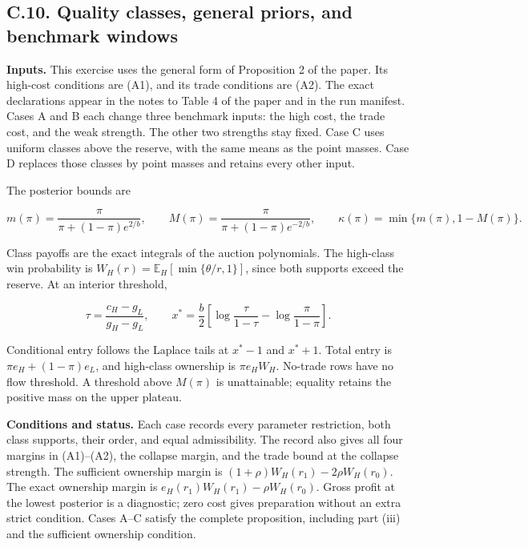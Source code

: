 \subsection{C.10. Quality classes, general priors, and benchmark
windows}\label{oa-c-classes}

\textbf{Inputs.} This exercise uses the general form of Proposition 2
of the paper. Its high-cost conditions are (A1), and its trade
conditions are (A2). The exact declarations appear in the notes to
Table 4 of the paper and in the run manifest. Cases A and B each change
three benchmark inputs: the high cost, the trade cost, and the weak
strength. The other two strengths stay fixed. Case C uses uniform
classes above the reserve, with the same means as the point masses.
Case D replaces those classes by point masses and retains every other
input.

The posterior bounds are

\[
m(\pi)=\frac{\pi}{\pi+(1-\pi)e^{2/b}},\qquad
M(\pi)=\frac{\pi}{\pi+(1-\pi)e^{-2/b}},\qquad
\kappa(\pi)=\min\{m(\pi),1-M(\pi)\}.
\]

Class payoffs are the exact integrals of the auction polynomials. The
high-class win probability is
\(W_H(r)=\mathbb E_H[\min\{\theta/r,1\}]\), since both supports exceed
the reserve. At an interior threshold,

\[
\tau=\frac{c_H-g_L}{g_H-g_L},\qquad
x^*=\frac b2\left[\log\frac{\tau}{1-\tau}-\log\frac{\pi}{1-\pi}\right].
\]

Conditional entry follows the Laplace tails at \(x^*-1\) and
\(x^*+1\). Total entry is \(\pi e_H+(1-\pi)e_L\), and high-class
ownership is \(\pi e_HW_H\). No-trade rows have no flow threshold. A
threshold above \(M(\pi)\) is unattainable; equality retains the
positive mass on the upper plateau.

\textbf{Conditions and status.} Each case records every parameter
restriction, both class supports, their order, and equal admissibility.
The record also gives all four margins in (A1)--(A2), the collapse
margin, and the trade bound at the collapse strength. The sufficient
ownership margin is \((1+\rho)W_H(r_1)-2\rho W_H(r_0)\). The exact
ownership margin is \(e_H(r_1)W_H(r_1)-\rho W_H(r_0)\). Gross profit at
the lowest posterior is a diagnostic; zero cost gives preparation
without an extra strict condition. Cases A--C satisfy the complete
proposition, including part (iii) and the sufficient ownership
condition.

